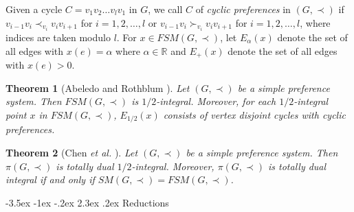 \documentclass[11pt]{article}
\makeatletter
\newtheorem{theorem}{Theorem}%
\numberwithin{theorem}{section}
\renewcommand\section{%
  \@startsection{section}{1}
                {\z@}%
                {-3.5ex \@plus -1ex \@minus -.2ex}%
                {2.3ex \@plus.2ex}%
                {\large\bfseries}%
}
\makeatother
\begin{document}
Given a cycle $C=v_1 v_2 \ldots v_l v_1$ in $G$, we call $C$ of \textit{cyclic preferences} in $(G,\prec)$ if
$v_{i-1} v_i \prec_{v_i} v_i v_{i+1}$ for $i=1,2,\ldots,l$
or $v_{i-1} v_i\succ_{v_i} v_i v_{i+1}$ for $i=1,2,\ldots,l$,
where indices are taken modulo $l$.
For $x\in FSM(G,\prec)$, let $E_{\alpha}(x)$ denote the set of all edges with $x(e)=\alpha$ where $\alpha\in\mathbb{R}$ and $E_+(x)$ denote the set of all edges with $x(e)>0$.

\begin{theorem}[Abeledo and Rothblum \cite{AbelRoth94}]
\label{thm:AbelRoth94}
Let $(G,\prec)$ be a simple preference system. Then $FSM(G,\prec)$ is $1/2$-integral. Moreover, for each $1/2$-integral point $x$ in $FSM(G,\prec)$, $E_{1/2}(x)$ consists of vertex disjoint cycles with cyclic preferences.
\end{theorem}

\begin{theorem}[Chen \textit{et al.} \cite{ChenDing12}]
\label{thm:ChenDing12}
Let $(G,\prec)$ be a simple preference system. Then $\pi(G,\prec)$ is totally dual $1/2$-integral. Moreover, $\pi(G,\prec)$ is totally dual integral if and only if $SM(G,\prec)=FSM(G,\prec)$.
\end{theorem}

\section{Reductions}
\end{document}
